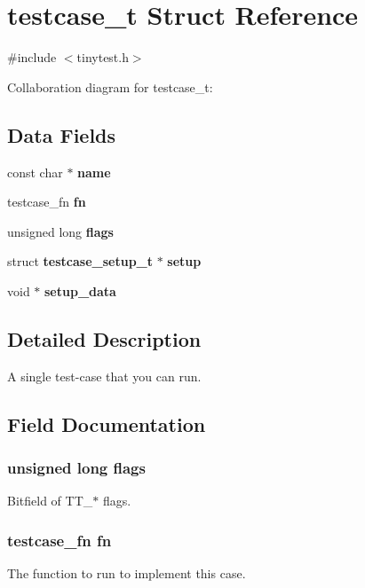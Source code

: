 \section{testcase\-\_\-t \-Struct \-Reference}
\label{structtestcase__t}


{\ttfamily \#include $<$tinytest.\-h$>$}



\-Collaboration diagram for testcase\-\_\-t\-:
\subsection*{\-Data \-Fields}
\begin{DoxyCompactItemize}
\item 
const char $\ast$ {\bf name}
\item 
testcase\-\_\-fn {\bf fn}
\item 
unsigned long {\bf flags}
\item 
struct {\bf testcase\-\_\-setup\-\_\-t} $\ast$ {\bf setup}
\item 
void $\ast$ {\bf setup\-\_\-data}
\end{DoxyCompactItemize}


\subsection{\-Detailed \-Description}
\-A single test-\/case that you can run. 

\subsection{\-Field \-Documentation}
\subsubsection[{flags}]{\setlength{\rightskip}{0pt plus 5cm}unsigned long {\bf flags}}\label{structtestcase__t_a9e339c2784bd040b26a5112866700bff}
\-Bitfield of \-T\-T\-\_\-$\ast$ flags. 
\subsubsection[{fn}]{\setlength{\rightskip}{0pt plus 5cm}testcase\-\_\-fn {\bf fn}}\label{structtestcase__t_a23f9705b5a9d2b6967a7af3d7f419dd6}
\-The function to run to implement this case. 
